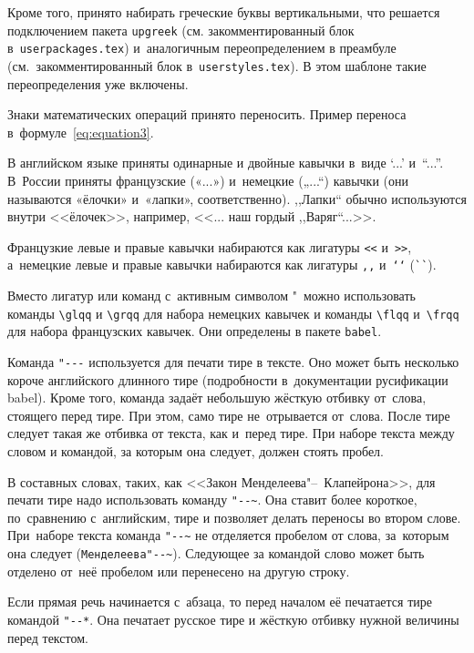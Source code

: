 Кроме того, принято набирать греческие буквы вертикальными, что
решается подключением пакета \verb|upgreek| (см. закомментированный
блок в~\verb|userpackages.tex|) и~аналогичным переопределением в
преамбуле (см.~закомментированный блок в~\verb|userstyles.tex|). В
этом шаблоне такие переопределения уже включены.

Знаки математических операций принято переносить. Пример переноса
в~формуле~\eqref{eq:equation3}.

В английском языке приняты одинарные и двойные кавычки в~виде ‘...’ и~“...”.
В~России приняты французские («...») и~немецкие („...“) кавычки (они называются
«ёлочки» и~«лапки», соответственно). ,,Лапки`` обычно используются внутри
<<ёлочек>>, например, <<... наш гордый ,,Варяг``...>>.

Французкие левые и правые кавычки набираются
как лигатуры \verb|<<| и~\verb|>>|, а~немецкие левые
и правые кавычки набираются как лигатуры \verb|,,| и~\verb|‘‘| (\verb|``|).

Вместо лигатур или команд с~активным символом "\ можно использовать команды
\verb|\glqq| и \verb|\grqq| для набора немецких кавычек и команды \verb|\flqq|
и~\verb|\frqq| для набора французских кавычек. Они определены в пакете
\verb|babel|.

Команда \verb|"---| используется для печати тире в тексте. Оно может быть
несколько короче английского длинного тире (подробности в~документации
русификации babel). Кроме того, команда задаёт небольшую жёсткую отбивку
от~слова, стоящего перед тире. При этом, само тире не~отрывается от~слова.
После тире следует такая же отбивка от текста, как и~перед тире. При наборе
текста между словом и командой, за которым она следует, должен стоять пробел.

В составных словах, таких, как <<Закон Менделеева"--~Клапейрона>>, для печати
тире надо использовать команду \verb|"--~|. Она ставит более короткое,
по~сравнению с~английским, тире и позволяет делать переносы во втором слове.
При~наборе текста команда \verb|"--~| не отделяется пробелом от слова,
за~которым она следует (\verb|Менделеева"--~|). Следующее за командой слово
может быть  отделено от~неё пробелом или перенесено на другую строку.

Если прямая речь начинается с~абзаца, то перед началом её печатается тире
командой \verb|"--*|. Она печатает русское тире и жёсткую отбивку нужной
величины перед текстом.


